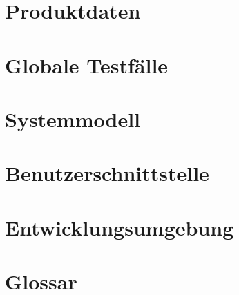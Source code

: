 \documentclass[parskip=full]{scrartcl}
\begin{document}
\section{Produktdaten}


\section{Globale Testf\"alle}


\section{Systemmodell}


\section{Benutzerschnittstelle}


\section{Entwicklungsumgebung}


\section{Glossar}
\end{document}

